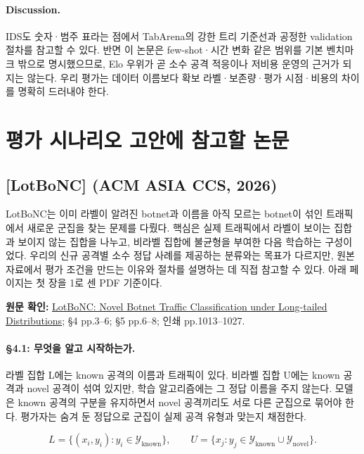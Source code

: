 \paragraph{Discussion.} IDS도 숫자·범주 표라는 점에서 TabArena의 강한 트리 기준선과 공정한 validation 절차를 참고할 수 있다. 반면 이 논문은 few-shot·시간 변화 같은 범위를 기본 벤치마크 밖으로 명시했으므로, Elo 우위가 곧 소수 공격 적응이나 저비용 운영의 근거가 되지는 않는다. 우리 평가는 데이터 이름보다 확보 라벨·보존량·평가 시점·비용의 차이를 명확히 드러내야 한다.


\clearpage

\section{평가 시나리오 고안에 참고할 논문}

\subsection{[LotBoNC] (ACM ASIA CCS, 2026)}

LotBoNC는 이미 라벨이 알려진 botnet과 이름을 아직 모르는 botnet이 섞인 트래픽에서 새로운 군집을 찾는 문제를 다뤘다. 핵심은 실제 트래픽에서 라벨이 보이는 집합과 보이지 않는 집합을 나누고, 비라벨 집합에 불균형을 부여한 다음 학습하는 구성이었다. 우리의 신규 공격별 소수 정답 사례를 제공하는 분류와는 목표가 다르지만, 원본 자료에서 평가 조건을 만드는 이유와 절차를 설명하는 데 직접 참고할 수 있다. 아래 페이지는 첫 장을 1로 센 PDF 기준이다.


{\small\textbf{원문 확인:} \href{https://doi.org/10.1145/3779208.3785276}{LotBoNC: Novel Botnet Traffic Classification under Long-tailed Distributions}; §4 pp.3–6; §5 pp.6–8; 인쇄 pp.1013–1027.}\par

\paragraph{§4.1: 무엇을 알고 시작하는가.} 라벨 집합 L에는 known 공격의 이름과 트래픽이 있다. 비라벨 집합 U에는 known 공격과 novel 공격이 섞여 있지만, 학습 알고리즘에는 그 정답 이름을 주지 않는다. 모델은 known 공격의 구분을 유지하면서 novel 공격끼리도 서로 다른 군집으로 묶어야 한다. 평가자는 숨겨 둔 정답으로 군집이 실제 공격 유형과 맞는지 채점한다.


\[
       L=\{(x_i,y_i): y_i\in\mathcal Y_{\mathrm{known}}\},\qquad
       U=\{x_j: y_j\in\mathcal Y_{\mathrm{known}}\cup\mathcal Y_{\mathrm{novel}}\}.
    \]

